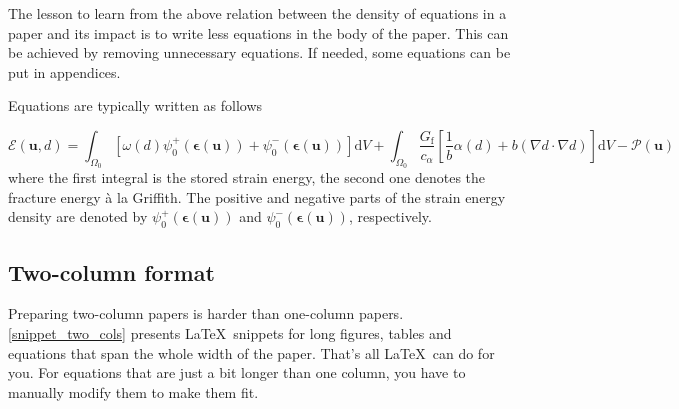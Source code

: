\documentclass[authoryear,3p,times,preprint,review,fleqn]{elsarticle}
\newcommand{\bfepsilon}{\boldsymbol{\epsilon}}
\newcommand{\bfu}{\boldsymbol{u}}
\newcommand{\td}{\text{d}}
\numberwithin{equation}{section}
\theoremstyle{remark}
\begin{document}
The lesson to learn from the above relation between the density of equations in a paper and its impact is to write less equations in the body of the paper. This can be achieved by removing unnecessary equations. If needed, some equations can be put in appendices.

Equations are typically written as follows

\begin{equation}
  \mathscr{E} (\bfu, d) 
    = \int_{\varOmega_{0}} \left[\omega(d)\psi_{0}^+(\bfepsilon (\bfu)) + \psi_{0}^-(\bfepsilon (\bfu)) \right]\td V
    + \int_{\varOmega_{0}}  \frac{G_\text{f}}{c_\alpha} \left[ \frac{1}{b} \alpha(d)
    + b \left( \nabla d \cdot \nabla d \right) \right] \td V
    - \mathscr{P} (\bfu)
\label{eq:3}
\end{equation}
where the first integral is the stored strain energy, the second one denotes the fracture energy \`a la Griffith. The positive and negative parts of the strain energy density are denoted by $\psi_{0}^+(\bfepsilon (\bfu))$ and $\psi_{0}^-(\bfepsilon (\bfu))$, respectively.


\subsection{Two-column format}\label{sec:two-col}

Preparing two-column papers is harder than one-column papers. \cref{snippet_two_cols} presents \LaTeX\ snippets for long figures, tables and equations that span the whole width of the paper. That's all \LaTeX\ can do for you. For equations that are just a bit longer than one column, you have to manually modify them to make them fit.

\begin{figure}[!h]
  \begin{snippetlatex}[caption={Writing two-column papers using \LaTeX.},label={snippet_two_cols},framerule=1pt,tabsize=3]
    \usepackage{mathtools, cuted} %

    \begin{figure}[!h]
    \end{figure}

    \begin{table}[!h]
    \end{table}
   
    \begin{strip}
    \end{strip}
  \end{snippetlatex}
\end{figure}
\end{document}
